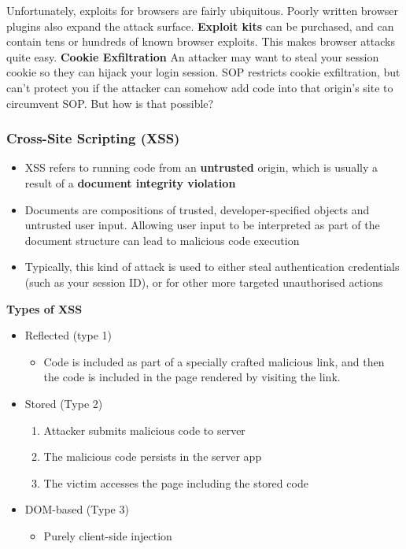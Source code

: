 \documentclass{article}
\begin{document}
Unfortunately, exploits for browsers are fairly ubiquitous. Poorly written browser plugins also expand the attack surface. \textbf{Exploit kits} can be purchased, and can contain tens or hundreds of known browser exploits. This makes browser attacks quite easy.
\textbf{Cookie Exfiltration}
An attacker may want to steal your session cookie so they can hijack your login session. SOP restricts cookie exfiltration, but can't protect you if the attacker can somehow add code into that origin's site to circumvent SOP. But how is that possible?

\subsubsection{Cross-Site Scripting (XSS)}
\begin{itemize}
    \item XSS refers to running code from an \textbf{untrusted} origin, which is usually a result of a \textbf{document integrity violation}
    \item Documents are compositions of trusted, developer-specified objects and untrusted user input. Allowing user input to be interpreted as part of the document structure can lead to malicious code execution
    \item Typically, this kind of attack is used to either steal authentication credentials (such as your session ID), or for other more targeted unauthorised actions
\end{itemize}
\textbf{Types of XSS}
\begin{itemize}
    \item Reflected (type 1)
        \begin{itemize}
            \item Code is included as part of a specially crafted malicious link, and then the code is included in the page rendered by visiting the link.
        \end{itemize}
    \item Stored (Type 2)
        \begin{enumerate}
            \item Attacker submits malicious code to server
            \item The malicious code persists in the server app
            \item The victim accesses the page including the stored code
        \end{enumerate}
    \item DOM-based (Type 3)
        \begin{itemize}
            \item Purely client-side injection
        \end{itemize}
\end{itemize}
\end{document}
